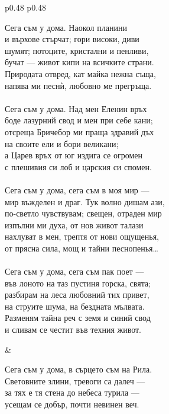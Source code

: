 \documentclass[12pt,a4paper]{article}
\begin{document}
\begin{tabular}{p{0.48\textwidth} p{0.48\textwidth}}
\begin{minipage}[t]{\linewidth}
Сега съм у дома. Наокол планини\\
и върхове стърчат; гори високи, диви\\
шумят; потоците, кристални и пенливи,\\
бучат — живот кипи на всичките страни.\\
Природата отвред, кат майка нежна съща,\\
напява ми песнѝ, любовно ме прегръща.\\
\\
Сега съм у дома. Над мен Еленин връх\\
боде лазурний свод и мен при себе кани;\\
отсреща Бричебор ми праща здравий дъх\\
на своите ели и бори великани;\\
а Царев връх от юг издига се огромен\\
с плешивия си лоб и царския си спомен.\\
\\
Сега съм у дома, сега съм в моя мир —\\
мир въжделен и драг. Тук волно дишам ази,\\
по-светло чувствувам; свещен, отраден мир\\
изпълни ми духа, от нов живот талази\\
нахлуват в мен, трептя от нови ощущенья,\\
от прясна сила, мощ и тайни песнопенья…\\
\\
Сега съм у дома, сега съм пак поет —\\
във лоното на таз пустиня горска, свята;\\
разбирам на леса любовний тих привет,\\
на струите шума, на бездната мълвата.\\
Разменям тайна реч с земя и синий свод\\
и сливам се честит във техния живот.\\
\end{minipage}
&
\begin{minipage}[t]{\linewidth}
Сега съм у дома, в сърцето съм на Рила.\\
Световните злини, тревоги са далеч —\\
за тях е тя стена до небеса турила —\\
усещам се добър, почти невинен веч.\\

\end{minipage}
\end{tabular}
\end{document}
